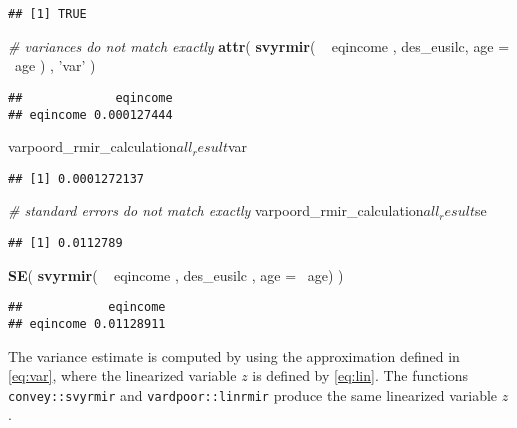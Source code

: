 \documentclass[]{book}
\newenvironment{Shaded}{\begin{snugshade}}{\end{snugshade}}
\newcommand{\KeywordTok}[1]{\textcolor[rgb]{0.13,0.29,0.53}{\textbf{{#1}}}}
\newcommand{\DataTypeTok}[1]{\textcolor[rgb]{0.13,0.29,0.53}{{#1}}}
\newcommand{\StringTok}[1]{\textcolor[rgb]{0.31,0.60,0.02}{{#1}}}
\newcommand{\CommentTok}[1]{\textcolor[rgb]{0.56,0.35,0.01}{\textit{{#1}}}}
\newcommand{\NormalTok}[1]{{#1}}
\theoremstyle{definition}
\theoremstyle{definition}
\theoremstyle{remark}
\begin{document}
\begin{verbatim}
## [1] TRUE
\end{verbatim}

\begin{Shaded}
\begin{Highlighting}[]
\CommentTok{# variances do not match exactly}
\KeywordTok{attr}\NormalTok{( }\KeywordTok{svyrmir}\NormalTok{( ~}\StringTok{ }\NormalTok{eqincome , des_eusilc, }\DataTypeTok{age =} \NormalTok{~age ) , }\StringTok{'var'} \NormalTok{) }
\end{Highlighting}
\end{Shaded}

\begin{verbatim}
##             eqincome
## eqincome 0.000127444
\end{verbatim}

\begin{Shaded}
\begin{Highlighting}[]
\NormalTok{varpoord_rmir_calculation$all_result$var}
\end{Highlighting}
\end{Shaded}

\begin{verbatim}
## [1] 0.0001272137
\end{verbatim}

\begin{Shaded}
\begin{Highlighting}[]
\CommentTok{# standard errors do not match exactly}
\NormalTok{varpoord_rmir_calculation$all_result$se}
\end{Highlighting}
\end{Shaded}

\begin{verbatim}
## [1] 0.0112789
\end{verbatim}

\begin{Shaded}
\begin{Highlighting}[]
\KeywordTok{SE}\NormalTok{( }\KeywordTok{svyrmir}\NormalTok{( ~}\StringTok{ }\NormalTok{eqincome , des_eusilc , }\DataTypeTok{age =} \NormalTok{~age) ) }
\end{Highlighting}
\end{Shaded}

\begin{verbatim}
##            eqincome
## eqincome 0.01128911
\end{verbatim}

The variance estimate is computed by using the approximation defined in
\eqref{eq:var}, where the linearized variable \(z\) is defined by
\eqref{eq:lin}. The functions \texttt{convey::svyrmir} and
\texttt{vardpoor::linrmir} produce the same linearized variable \(z\).
\end{document}
